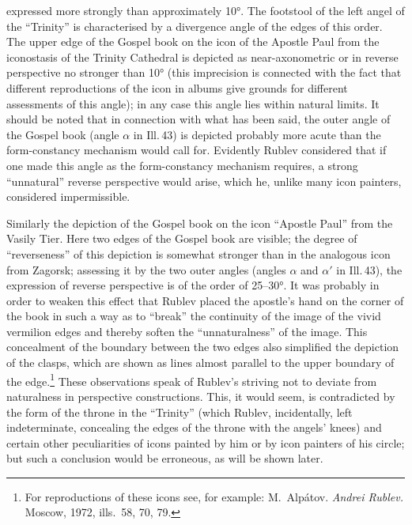 
expressed more strongly than approximately 10°.  The footstool of the left angel of
the ``Trinity'' is characterised by a divergence angle of the edges of this order.
The upper edge of the Gospel book on the icon of the Apostle Paul from the iconostasis
of the Trinity Cathedral is depicted as near-axonometric or in reverse perspective
no stronger than 10° (this imprecision is connected with the fact that different
reproductions of the icon in albums give grounds for different assessments of this
angle); in any case this angle lies within natural limits.  It should be noted that
in connection with what has been said, the outer angle of the Gospel book (angle
$\alpha$ in Ill.\,43) is depicted probably more acute than the form-constancy
mechanism would call for.  Evidently Rublev considered that if one made this angle
as the form-constancy mechanism requires, a strong ``unnatural'' reverse perspective
would arise, which he, unlike many icon painters, considered impermissible.

Similarly the depiction of the Gospel book on the icon ``Apostle Paul'' from the
Vasily Tier.  Here two edges of the Gospel book are visible; the degree of
``reverseness'' of this depiction is somewhat stronger than in the analogous icon
from Zagorsk; assessing it by the two outer angles (angles $\alpha$ and $\alpha'$ in
Ill.\,43), the expression of reverse perspective is of the order of 25--30°.  It was
probably in order to weaken this effect that Rublev placed the apostle's hand on the
corner of the book in such a way as to ``break'' the continuity of the image of the
vivid vermilion edges and thereby soften the ``unnaturalness'' of the image.  This
concealment of the boundary between the two edges also simplified the depiction of
the clasps, which are shown as lines almost parallel to the upper boundary of the
edge.\footnote{For reproductions of these icons see, for example: M.~Alpátov.
  \emph{Andrei Rublev.}  Moscow, 1972, ills.~58, 70, 79.}
These observations speak of Rublev's striving not to deviate from naturalness in
perspective constructions.  This, it would seem, is contradicted by the form of the
throne in the ``Trinity'' (which Rublev, incidentally, left indeterminate, concealing
the edges of the throne with the angels' knees) and certain other peculiarities of
icons painted by him or by icon painters of his circle; but such a conclusion would
be erroneous, as will be shown later.

